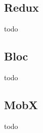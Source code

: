 \subsection{{Redux}}%
\label{sec:Redux}
todo
\\
\subsection{{Bloc}}%
\label{sec:Bloc}
todo
\\
\subsection{{MobX}}%
\label{sec:MobX}
todo







